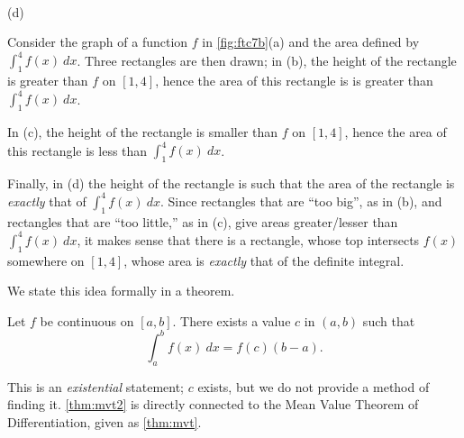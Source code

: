 {
\\(d)}

Consider the graph of a function $f$ in \autoref{fig:ftc7b}(a) and the area defined by $\int_1^4 f(x)\ dx$. Three rectangles are then drawn; in (b), the height of the rectangle is greater than $f$ on $[1,4]$, hence the area of this rectangle is is greater than $\int_1^4 f(x)\ dx$. 

In (c), the height of the rectangle is smaller than $f$ on $[1,4]$, hence the area of this rectangle is less than $\int_1^4 f(x)\ dx$.

Finally, in (d) the height of the rectangle is such that the area of the rectangle is \textit{exactly} that of $\int_1^4 f(x)\ dx$. Since rectangles that are ``too big\primeskip'', as in (b), and rectangles that are ``too little,'' as in (c), give areas greater/lesser than $\int_1^4 f(x)\ dx$, it makes sense that there is a rectangle, whose top intersects $f(x)$ somewhere on $[1,4]$, whose area is \textit{exactly} that of the definite integral.

We state this idea formally in a theorem.

\begin{theorem}\label{thm:mvt2}
Let $f$ be continuous on $[a,b]$. There exists a value $c$ in $(a,b)$ such that
\[\int_a^bf(x)\ dx = f(c)(b-a).\]
\end{theorem}

This is an \emph{existential} statement; $c$ exists, but we do not provide a method of finding it. \autoref{thm:mvt2} is directly connected to the Mean Value Theorem of Differentiation, given %
as \autoref{thm:mvt}. %

